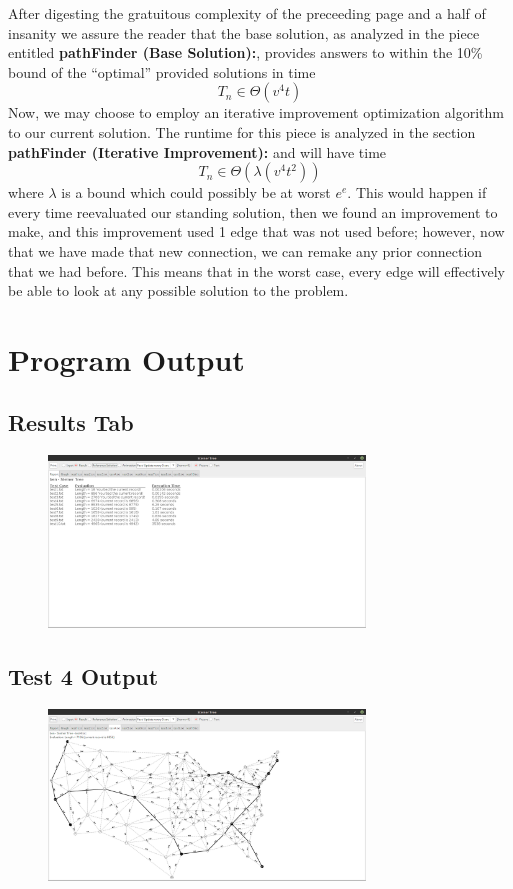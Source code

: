 \documentclass[12pt]{article}
\begin{document}
After digesting the gratuitous complexity of the preceeding page and a half of
insanity we assure the reader that the base solution, as analyzed in the 
piece entitled \textbf{pathFinder (Base Solution):}, provides answers to within
the 10\% bound of the ``optimal'' provided solutions in time 
$$
T_n \in \Theta(v^4t)
$$
Now, we may choose to employ an iterative improvement optimization algorithm to 
our current solution. The runtime for this piece is analyzed in the section
\textbf{pathFinder (Iterative Improvement):} and will have time
$$
T_n \in \Theta(\lambda(v^4t^2))
$$
where $\lambda$ is a bound which could possibly be at worst $e^e$. This would 
happen if every time reevaluated our standing solution, then we found an
improvement to make, and this improvement used 1 edge that was not used before;
however, now that we have made that new connection, we can remake any prior 
connection that we had before. This means that in the worst case, every edge
will effectively be able to look at any possible solution to the problem.

\section{Program Output}

\subsection*{Results Tab}

\begin{figure}[h]
    \centering
    \includegraphics[width=0.75\textwidth]{restab.png}
\end{figure}
\newpage
\subsection*{Test 4 Output}

\begin{figure}[h]
    \centering
    \includegraphics[width=0.75\textwidth]{test4.png}
\end{figure}
\end{document}
